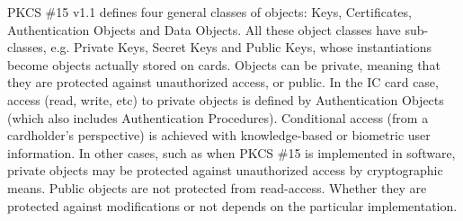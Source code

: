\documentclass{article}
\begin{document}
PKCS \#15 v1.1 defines four general classes of objects: Keys, 
Certificates, Authentication Objects and Data Objects. 
All these object classes have sub-classes, e.g. Private Keys, 
Secret Keys and Public Keys, whose instantiations become 
objects actually stored on cards. 
Objects can be private, meaning that they are protected against 
unauthorized access, or public. In the IC card case, access 
(read, write, etc) to private objects is defined by Authentication 
Objects (which also includes Authentication Procedures). Conditional 
access (from a cardholder's perspective) is achieved with knowledge-based 
or biometric user information. In other cases, such as when PKCS \#15 is 
implemented in software, private objects may be protected against 
unauthorized access by cryptographic means. Public objects are not 
protected from read-access. Whether they are protected against
modifications or not depends on the particular implementation.
\end{document}
